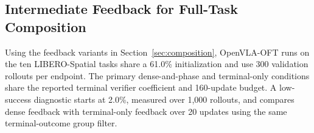 \subsection{Intermediate Feedback for Full-Task Composition}\label{sec:libero_results}
Using the feedback variants in Section~\ref{sec:composition}, OpenVLA-OFT runs on the ten LIBERO-Spatial tasks share a 61.0\% initialization and use 300 validation rollouts per endpoint. The primary dense-and-phase and terminal-only conditions share the reported terminal verifier coefficient and 160-update budget. A low-success diagnostic starts at 2.0\%, measured over 1,000 rollouts, and compares dense feedback with terminal-only feedback over 20 updates using the same terminal-outcome group filter.
